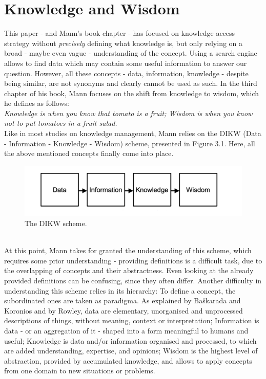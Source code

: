 \chapter{Knowledge and Wisdom}
This paper - and Mann's book chapter - has focused on knowledge access strategy without \textit{precisely} defining what knowledge is, but only relying on a broad - maybe even vague - understanding of the concept. Using a search engine allows to find data which may contain some useful information to answer our question. However, all these concepts - data, information, knowledge - despite being similar, are not synonyms and clearly cannot be used as such. 
In the third chapter of his book, Mann focuses on the shift from knowledge to wisdom, which he defines as follows:\\
\textit{Knowledge is when you know that tomato is a fruit; Wisdom is when you know not to put tomatoes in a fruit salad.} \cite{darrell2004hands}\\
Like in most studies on knowledge management, Mann relies on the DIKW (Data - Information - Knowledge - Wisdom) scheme, presented in Figure 3.1. Here, all the above mentioned concepts finally come into place. \\
\begin{figure}[h]
	\centering
	\includegraphics[width=\textwidth]{pic4.png}
	\caption{The DIKW scheme. \cite{darrell2004hands}}
\end{figure}\\
At this point, Mann takes for granted the understanding of this scheme, which requires some prior understanding - providing definitions is a difficult task, due to the overlapping of concepts and their abstractness. Even looking at the already provided definitions can be confusing, since they often differ. Another difficulty in understanding this scheme relies in its hierarchy: To define a concept, the subordinated ones are taken as paradigma. As explained by Baškarada and Koronios\cite{DIKW} and by Rowley\cite{DIKW2}, data are elementary, unorganised and unprocessed descriptions of things, without meaning, context or interpretation; Information is data - or an aggregation of it - shaped into a form meaningful to humans and useful; Knowledge is data and/or information organised and processed, to which are added understanding, expertise, and opinions; Wisdom is the highest level of abstraction, provided by accumulated knowledge, and allows to apply concepts from one domain to new situations or problems.\cite{DIKW}\\
